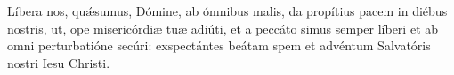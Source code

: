Líbera nos, quǽsumus, Dómine, ab ómnibus malis, da propítius pacem in diébus nostris, ut, ope misericórdiæ tuæ adiúti, et a peccáto simus semper líberi et ab omni perturbatióne secúri: exspectántes beátam spem et advéntum Salvatóris nostri Iesu Christi.
